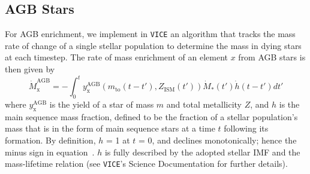 \subsection{AGB Stars} 
For AGB enrichment, we implement in \texttt{VICE} an algorithm that tracks the 
mass rate of change of a single stellar population to determine the mass in 
dying stars at each timestep. The rate of mass enrichment of an element $x$ 
from AGB stars is then given by 
\begin{equation} 
\label{bursts:eq:mdot_agb} 
\dot{M}_\text{x}^\text{AGB} = -\int_0^t y_\text{x}^\text{AGB}(m_\text{to}
(t - t'), Z_\text{ISM}(t'))\dot{M}_*(t')\dot{h}(t - t')dt' 
\end{equation} 
where $y_\text{x}^\text{AGB}$ is the yield of a star of mass $m$ and 
total metallicity $Z$, and $h$ is the main sequence mass fraction, 
defined to be the fraction of a stellar population's mass that is in the form 
of main sequence stars at a time $t$ following its formation. By definition, 
$h$ = 1 at $t$ = 0, and declines monotonically; hence the minus sign in 
equation~. $h$ is fully described by the adopted 
stellar IMF and the mass-lifetime relation (see \texttt{VICE}'s Science 
Documentation for further details). 

